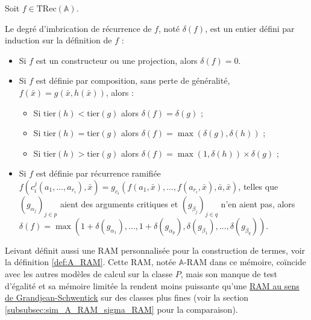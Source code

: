 \documentclass{report}
\newcommand{\bbA}{\mathbb{A}}
\newcommand{\TRec}[1]{\text{TRec}\left(\mathbb{#1}\right)}
\begin{document}
			
			\begin{definition}
				\label{def:degre_recurrence}
				
				Soit $f \in \TRec{A}$. 
				
				
				Le degré d'imbrication de récurrence de $f$, noté $\delta(f)$, est un entier défini par induction sur la définition de $f$ :
				
				\begin{itemize}[itemsep=-1mm]
					\item 	Si $f$ est un constructeur ou une projection, alors $\delta(f) = 0$.
					\item 	Si $f$ est définie par composition, sans perte de généralité, $f(\bar{x}) = g\left( \bar{x}, h\left( \bar{x}\right)\right)$, alors :
					
							\begin{itemize}[itemsep=-1mm]
								\item 	Si $\text{tier}(h) < \text{tier}(g)$ alors $\delta(f) = \delta(g)$ ;
								\item 	Si $\text{tier}(h) = \text{tier}(g)$ alors $\delta(f) = \max\left(\delta(g), \delta(h)\right)$ ;
								\item 	Si $\text{tier}(h) > \text{tier}(g)$ alors $\delta(f) = \max\left(1, \delta(h)\right) \times \delta(g)$ ;
							\end{itemize}
							
					\item 	Si $f$ est définie par récurrence ramifiée $f(c_i^j(a_1, \dots, a_{r_i}), \bar{x}) = g_{c_i}\left( f(a_1, \bar{x}), \dots, f(a_{r_i}, \bar{x}), \bar{a}, \bar{x} \right)$, telles que $\left( g_{\alpha_j}\right)_{j\in p}$ aient des arguments critiques et $\left( g_{\beta_j}\right)_{j\in q}$ n'en aient pas, alors $\delta(f) = \max\left( 1 + \delta\left( g_{\alpha_1} \right), \dots,  1 + \delta\left( g_{\alpha_p} \right), \delta\left( g_{\beta_1} \right), \dots,  \delta\left( g_{\beta_q} \right)\right)$. 
				\end{itemize}
			\end{definition}
			
			
			Leivant définit aussi une RAM personnalisée pour la construction de termes, voir la définition \ref{def:A_RAM}. Cette RAM, notée $\bbA$-RAM dans ce mémoire, coïncide avec les autres modèles de calcul sur la classe $P$, mais son manque de test d'égalité et sa mémoire limitée la rendent moins puissante qu'une \hyperref[def:sigma_RAM]{RAM au sens de Grandjean-Schwentick} \cite{GrandjeanSchwentick2002} sur des classes plus fines (voir la section \ref{subsubsec:sim_A_RAM_sigma_RAM} pour la comparaison).
			
\end{document}
